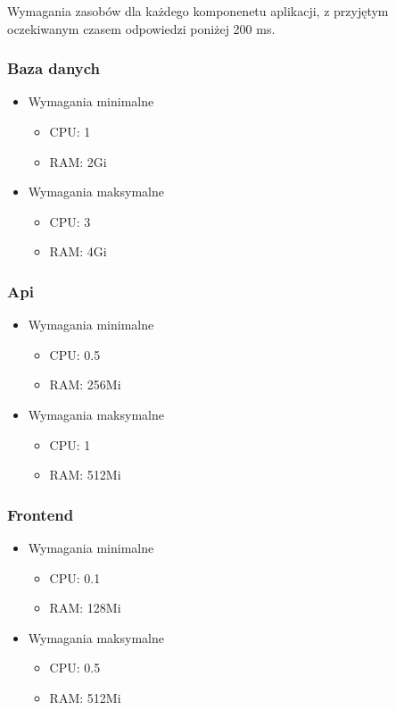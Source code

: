 \documentclass[12pt,a4paper]{article}
\begin{document}
Wymagania zasobów dla każdego komponenetu aplikacji, z przyjętym oczekiwanym czasem odpowiedzi poniżej 200 ms.

\subsubsection{Baza danych}
\begin{itemize}
    \item Wymagania minimalne
    \begin{itemize}
        \item CPU: 1
        \item RAM: 2Gi
    \end{itemize}
    
    \item Wymagania maksymalne
    \begin{itemize}
        \item CPU: 3
        \item RAM: 4Gi
    \end{itemize}
\end{itemize}

\subsubsection{Api}
\begin{itemize}
    \item Wymagania minimalne
    \begin{itemize}
        \item CPU: 0.5
        \item RAM: 256Mi
    \end{itemize}
    
    \item Wymagania maksymalne
    \begin{itemize}
        \item CPU: 1
        \item RAM: 512Mi
    \end{itemize}
\end{itemize}

\subsubsection{Frontend}
\begin{itemize}
    \item Wymagania minimalne
    \begin{itemize}
        \item CPU: 0.1
        \item RAM: 128Mi
    \end{itemize}
    
    \item Wymagania maksymalne
    \begin{itemize}
        \item CPU: 0.5
        \item RAM: 512Mi
    \end{itemize}
\end{itemize}
\end{document}
